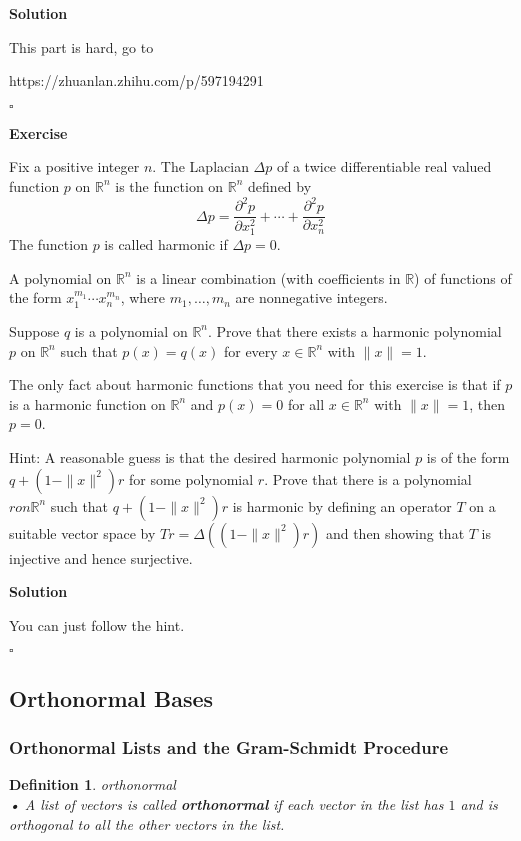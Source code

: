 \documentclass{article}
\newtheorem{definition}{Definition}[subsection]
\newenvironment{exercise}{%
{\textbf{Exercise\\}
    }
}{
}
\newenvironment{solution}{%
{
    \textbf{Solution\\}
    }
}{
  \hfill $\square$ 
  \par\bigskip 
}
\newcommand{\RR}{\mathbb{R}}
\begin{document}
\begin{CJK}{UTF8}{gkai}
\begin{solution}
    This part is hard, go to 
    
    https://zhuanlan.zhihu.com/p/597194291
\end{solution}

\begin{exercise}
    Fix a positive integer $n$. The Laplacian $\Delta p$ of a twice differentiable real valued function $p$ on $\RR^n$ is the function on $\RR^n$ defined by
    \[\Delta p = \dfrac{\partial^2 p}{\partial x_1^2} + \cdots + \dfrac{\partial^2 p}{\partial x_n^2}\]
    The function $p$ is called harmonic if $\Delta p = 0$.

    A polynomial on $\RR^n$ is a linear combination (with coefficients in $\RR$) of functions of the form $x_1^{m_1}\cdots x_n^{m_n}$, where $m_1,\ldots,m_n$ are nonnegative integers.

    Suppose $q$ is a polynomial on $\RR^n$. Prove that there exists a harmonic polynomial $p$ on $\RR^n$ such that $p(x) = q(x)$ for every $x \in \RR^n$ with $\|x\| = 1$.

    The only fact about harmonic functions that you need for this exercise is that if $p$ is a harmonic function on $\RR^n$ and $p(x) = 0$ for all $x \in \RR^n$ with $\|x\| = 1$, then $p = 0$.

    Hint: A reasonable guess is that the desired harmonic polynomial $p$ is of the form $q+(1-\|x\|^2)r$ for some polynomial $r$. Prove that there is a polynomial $r on \RR^n$ such that $q +(1-\|x\|^2)r$ is harmonic by defining an operator $T$ on a suitable vector space by $Tr = \Delta ((1-\|x\|^2)r)$ and then showing that $T$ is injective and hence surjective.
\end{exercise}

\begin{solution}
    You can just follow the hint.
\end{solution}

\subsection{Orthonormal Bases}
\subsubsection{Orthonormal Lists and the Gram-Schmidt Procedure}
\begin{definition}
    orthonormal\\

    • A list of vectors is called \textbf{orthonormal} if each vector in the list has  $1$ and is orthogonal to all the other vectors in the list.


\end{definition}
\end{CJK}
\end{document}
